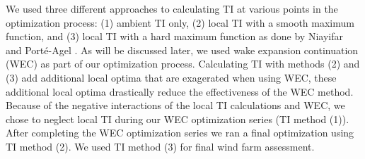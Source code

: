 \documentclass[conf]{new-aiaa}
\begin{document}
We used three different approaches to calculating TI at various points in the optimization process: (1)  ambient TI only, (2) local TI with a smooth maximum function, and (3) local TI with a hard maximum function as done by Niayifar and Port\'{e}-Agel \cite{niayifar2016}. As will be discussed later, we used wake expansion continuation (WEC) as part of our optimization process. Calculating TI with methods (2) and (3) add additional local optima that are exagerated when using WEC, these additional local optima drastically reduce the effectiveness of the WEC method. Because of the negative interactions of the local TI calculations and WEC, we chose to neglect local TI during our WEC optimization series (TI method (1)). After completing the WEC optimization series we ran a final optimization using TI method (2). We used TI method (3) for final wind farm assessment.
\end{document}
